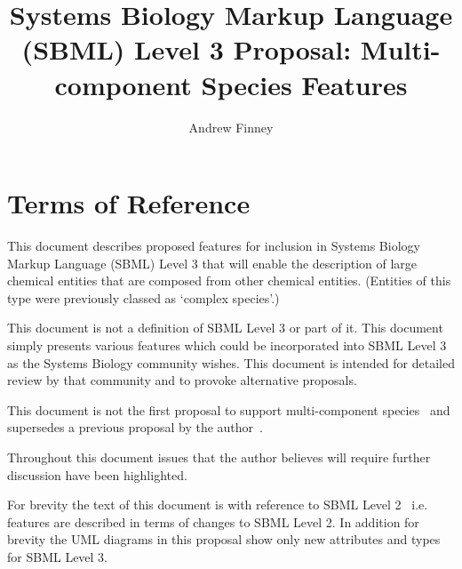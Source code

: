 \documentclass{cekarticle}
\begin{document}

\title{Systems Biology Markup Language (SBML) Level 3 Proposal: Multi-component Species Features}

\author{Andrew Finney}


\maketitlepage


\section{Terms of Reference}
\label{sec:t-o-r}

This document describes proposed features for inclusion in Systems
Biology Markup Language (SBML) Level 3 that will enable the
description of large chemical entities that are composed from
other chemical entities.  (Entities of this type were previously
classed as `complex species'.)

This document is not a definition of SBML Level 3 or part of it.
This document simply presents various features which could be
incorporated into SBML Level 3 as the Systems Biology community
wishes.  This document is intended for detailed review by that
community and to provoke alternative proposals.

This document is not the first proposal to support multi-component species~\citep{lenovere:2002}
and supersedes a previous proposal by the author~\citep{finney:2001f}.

Throughout this
document issues that the author believes will require further
discussion have been highlighted.

For brevity the text of this document is with reference to SBML
Level 2~\citep{finney:2002f} i.e. features are described in terms
of changes to SBML Level 2.  In addition for brevity the UML diagrams in this proposal
show only new attributes and types for SBML Level 3.
\end{document}
